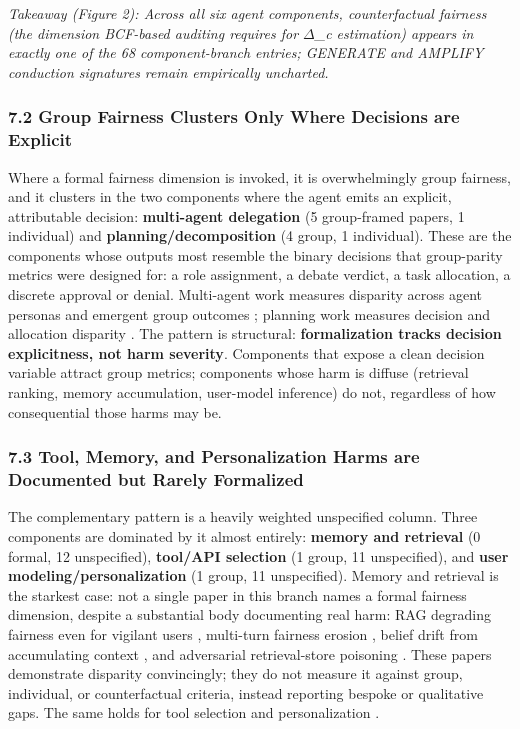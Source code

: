 \documentclass[10pt]{article}
\begin{document}
\emph{Takeaway (Figure 2): Across all six agent components, counterfactual fairness (the dimension BCF-based auditing requires for $\Delta$\_c estimation) appears in exactly one of the 68 component-branch entries; GENERATE and AMPLIFY conduction signatures remain empirically uncharted.}

\subsubsection*{7.2 Group Fairness Clusters Only Where Decisions are Explicit}

Where a formal fairness dimension is invoked, it is overwhelmingly group fairness, and it clusters in the two components where the agent emits an explicit, attributable decision: \textbf{multi-agent delegation} (5 group-framed papers, 1 individual) and \textbf{planning/decomposition} (4 group, 1 individual). These are the components whose outputs most resemble the binary decisions that group-parity metrics were designed for: a role assignment, a debate verdict, a task allocation, a discrete approval or denial. Multi-agent work measures disparity across agent personas and emergent group outcomes \cite{madigan2025emergent,nguyen2025social,li2025from,mirza2025malibu}; planning work measures decision and allocation disparity \cite{li2025actions,hall2025guiding,parziale2026once}. The pattern is structural: \textbf{formalization tracks decision explicitness, not harm severity}. Components that expose a clean decision variable attract group metrics; components whose harm is diffuse (retrieval ranking, memory accumulation, user-model inference) do not, regardless of how consequential those harms may be.

\subsubsection*{7.3 Tool, Memory, and Personalization Harms are Documented but Rarely Formalized}

The complementary pattern is a heavily weighted unspecified column. Three components are dominated by it almost entirely: \textbf{memory and retrieval} (0 formal, 12 unspecified), \textbf{tool/API selection} (1 group, 11 unspecified), and \textbf{user modeling/personalization} (1 group, 11 unspecified). Memory and retrieval is the starkest case: not a single paper in this branch names a formal fairness dimension, despite a substantial body documenting real harm: RAG degrading fairness even for vigilant users \cite{hu2024free}, multi-turn fairness erosion \cite{fan2024fairmt}, belief drift from accumulating context \cite{geng2025accumulating,simhi2026old}, and adversarial retrieval-store poisoning \cite{wang2025bias}. These papers demonstrate disparity convincingly; they do not measure it against group, individual, or counterfactual criteria, instead reporting bespoke or qualitative gaps. The same holds for tool selection \cite{blankenstein2025biasbusters,sneh2025tooltweak} and personalization \cite{kantharuban2024stereotype,pawar2025presumed,mire2025rejected,tonneau2026different}.
\end{document}
